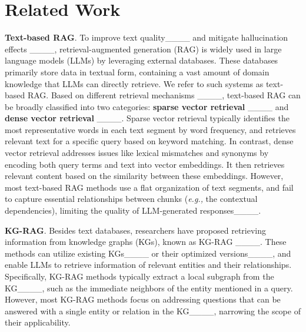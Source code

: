 \section{Related Work}
\textbf{Text-based RAG}.
To improve text quality____ and mitigate hallucination effects ____, retrieval-augmented generation (RAG) is widely used in large language models (LLMs) by leveraging external databases. These databases primarily store data in textual form, containing a vast amount of domain knowledge that LLMs can directly retrieve. We refer to such systems as text-based RAG. Based on different retrieval mechanisms ____, text-based RAG can be broadly classified into two categories: \textbf{sparse vector retrieval} ____ and \textbf{dense vector retrieval} ____. Sparse vector retrieval typically identifies the most representative words in each text segment by word frequency, and retrieves relevant text for a specific query based on keyword matching. In contrast, dense vector retrieval addresses issues like lexical mismatches and synonyms by encoding both query terms and text into vector embeddings. It then retrieves relevant content based on the similarity between these embeddings. However, most text-based RAG methods use a flat organization of text segments, and fail to capture essential relationships between chunks (\textit{e.g.,} the contextual dependencies), limiting the quality of LLM-generated responses____.

\textbf{KG-RAG}.
Besides text databases, researchers have proposed retrieving information from knowledge graphs (KGs), known as KG-RAG ____. These methods can utilize existing KGs____ or their optimized versions____, and enable LLMs to retrieve information of relevant entities and their relationships. Specifically, KG-RAG methods typically extract a local subgraph from the KG____, such as the immediate neighbors of the entity mentioned in a query. However, most KG-RAG methods focus on addressing questions that can be answered with a single entity or relation in the KG____, narrowing the scope of their applicability. 


